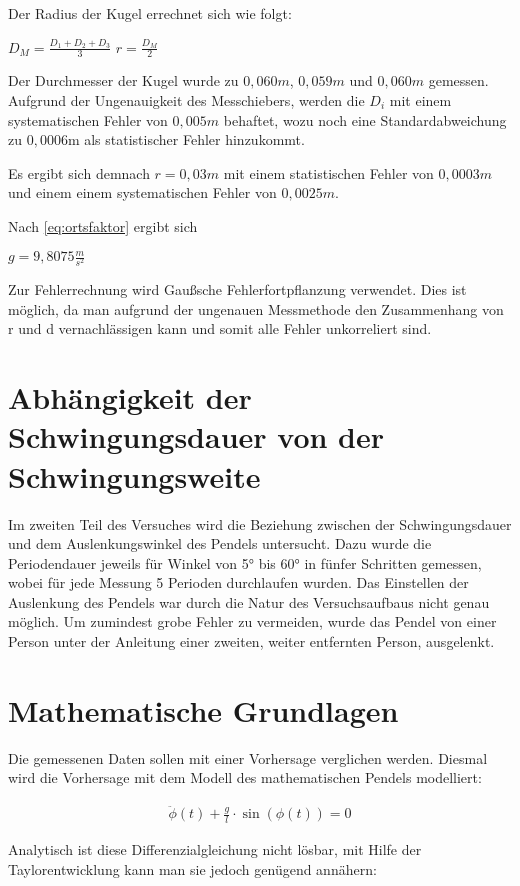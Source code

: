 Der Radius der Kugel errechnet sich wie folgt:

$D_M = \frac{D_1 + D_2 + D_3}{3}$
$r = \frac{D_M}{2}$

Der Durchmesser der Kugel wurde zu $0,060m$, $0,059m$ und $0,060m$ gemessen.
Aufgrund der Ungenauigkeit des Messchiebers, werden die $D_i$ mit einem systematischen Fehler von $0,005m$ behaftet, wozu noch eine Standardabweichung zu $0,0006$m als statistischer Fehler hinzukommt.

Es ergibt sich demnach $r = 0,03m$ mit einem statistischen Fehler von $0,0003m$ und einem einem systematischen Fehler von $0,0025m$.

Nach \ref{eq:ortsfaktor} ergibt sich

$g = 9,8075\frac{m}{s^2}$

Zur Fehlerrechnung wird Gaußsche Fehlerfortpflanzung verwendet. Dies ist möglich, da man aufgrund der ungenauen Messmethode den Zusammenhang von r und d vernachlässigen kann und somit alle Fehler unkorreliert sind.

\section{Abhängigkeit der Schwingungsdauer von der Schwingungsweite}

Im zweiten Teil des Versuches wird die Beziehung zwischen der Schwingungsdauer und dem Auslenkungswinkel des Pendels untersucht.
Dazu wurde die Periodendauer jeweils für Winkel von 5° bis 60° in fünfer Schritten gemessen,
wobei für jede Messung 5 Perioden durchlaufen wurden.
Das Einstellen der Auslenkung des Pendels war durch die Natur des Versuchsaufbaus nicht genau möglich.
Um zumindest grobe Fehler zu vermeiden, wurde das Pendel von einer Person unter der Anleitung einer zweiten, weiter entfernten Person, ausgelenkt.

\section{Mathematische Grundlagen}

Die gemessenen Daten sollen mit einer Vorhersage verglichen werden.
Diesmal wird die Vorhersage mit dem Modell des mathematischen Pendels modelliert:

\begin{align}
	\ddot{\phi}(t) + \frac{g}{l} \cdot \sin ( \phi (t)) = 0
\end{align}

Analytisch ist diese Differenzialgleichung nicht lösbar, mit Hilfe der Taylorentwicklung kann man sie jedoch genügend annähern:

